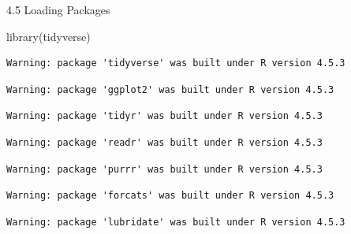 \documentclass[
  ignorenonframetext,
  aspectratio=169,
]{beamer}
\newenvironment{Shaded}{\begin{snugshade}}{\end{snugshade}}
\newcommand{\FunctionTok}[1]{\textcolor[rgb]{0.28,0.35,0.67}{#1}}
\newcommand{\NormalTok}[1]{\textcolor[rgb]{0.00,0.23,0.31}{#1}}
\begin{document}
\begin{frame}[fragile]{4.5 Loading Packages}
\protect{}\label{loading-packages}
\begin{Shaded}
\begin{Highlighting}[]
\FunctionTok{library}\NormalTok{(tidyverse)}
\end{Highlighting}
\end{Shaded}

\begingroup\tiny\color{darkgray}

\begin{verbatim}
Warning: package 'tidyverse' was built under R version 4.5.3
\end{verbatim}

\endgroup

\begingroup\tiny\color{darkgray}

\begin{verbatim}
Warning: package 'ggplot2' was built under R version 4.5.3
\end{verbatim}

\endgroup

\begingroup\tiny\color{darkgray}

\begin{verbatim}
Warning: package 'tidyr' was built under R version 4.5.3
\end{verbatim}

\endgroup

\begingroup\tiny\color{darkgray}

\begin{verbatim}
Warning: package 'readr' was built under R version 4.5.3
\end{verbatim}

\endgroup

\begingroup\tiny\color{darkgray}

\begin{verbatim}
Warning: package 'purrr' was built under R version 4.5.3
\end{verbatim}

\endgroup

\begingroup\tiny\color{darkgray}

\begin{verbatim}
Warning: package 'forcats' was built under R version 4.5.3
\end{verbatim}

\endgroup

\begingroup\tiny\color{darkgray}

\begin{verbatim}
Warning: package 'lubridate' was built under R version 4.5.3
\end{verbatim}


\end{frame}
\end{document}

